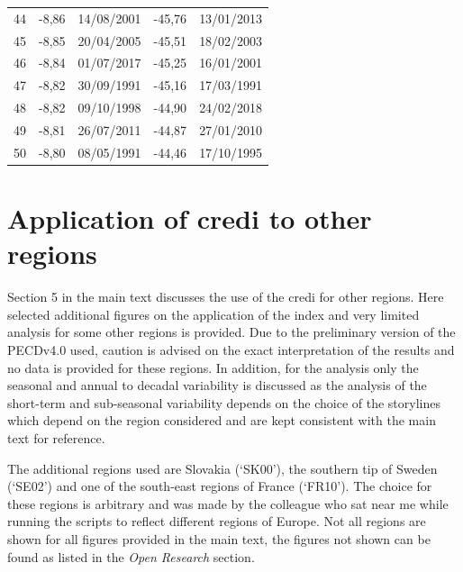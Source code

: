 \documentclass[12pt]{iopart}
\newcommand{\credi}[0]{{\sc credi}}
\begin{document}
\begin{longtable}{|r|rl|rl|}
44        & -8,86           & 14/08/2001     & -45,76          & 13/01/2013     \\
45        & -8,85           & 20/04/2005     & -45,51          & 18/02/2003     \\
46        & -8,84           & 01/07/2017     & -45,25          & 16/01/2001     \\
47        & -8,82           & 30/09/1991     & -45,16          & 17/03/1991     \\
48        & -8,82           & 09/10/1998     & -44,90          & 24/02/2018     \\
49        & -8,81           & 26/07/2011     & -44,87          & 27/01/2010     \\
50        & -8,80           & 08/05/1991     & -44,46          & 17/10/1995     
\end{longtable}  


\clearpage
\section{Application of \credi{} to other regions}\label{app:regions}
Section 5 in the main text discusses the use of the \credi{} for other regions. 
Here selected additional figures on the application of the index and very limited analysis for some other regions is provided.
Due to the preliminary version of the PECDv4.0 used, caution is advised on the exact interpretation of the results and no data is  provided for these regions. 
In addition, for the analysis only the seasonal and annual to decadal variability is discussed as the analysis of the short-term and sub-seasonal variability depends on the choice of the storylines which depend on the region considered and are kept consistent with the main text for reference.

The additional regions used are Slovakia (`SK00'), the southern tip of Sweden (`SE02') and one of the south-east regions of France (`FR10').
The choice for these regions is arbitrary and was made by the colleague who sat near me while running the scripts to reflect different regions of Europe. 
Not all regions are shown for all figures provided in the main text, the figures not shown can be found as listed in the \emph{Open Research} section.
\end{document}
